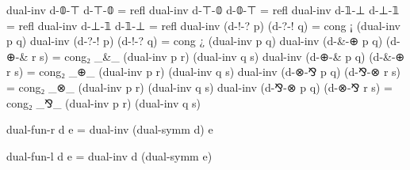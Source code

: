 \begin{code}[hide]
dual-inv d-𝟘-⊤ d-⊤-𝟘 = refl
dual-inv d-⊤-𝟘 d-𝟘-⊤ = refl
dual-inv d-𝟙-⊥ d-⊥-𝟙 = refl
dual-inv d-⊥-𝟙 d-𝟙-⊥ = refl
dual-inv (d-!-? p) (d-?-! q) = cong ¡ (dual-inv p q)
dual-inv (d-?-! p) (d-!-? q) = cong ¿ (dual-inv p q)
dual-inv (d-&-⊕ p q) (d-⊕-& r s) = cong₂ _&_ (dual-inv p r) (dual-inv q s)
dual-inv (d-⊕-& p q) (d-&-⊕ r s) = cong₂ _⊕_ (dual-inv p r) (dual-inv q s)
dual-inv (d-⊗-⅋ p q) (d-⅋-⊗ r s) = cong₂ _⊗_ (dual-inv p r) (dual-inv q s)
dual-inv (d-⅋-⊗ p q) (d-⊗-⅋ r s) = cong₂ _⅋_ (dual-inv p r) (dual-inv q s)

dual-fun-r d e = dual-inv (dual-symm d) e

dual-fun-l d e = dual-inv d (dual-symm e)
\end{code}

